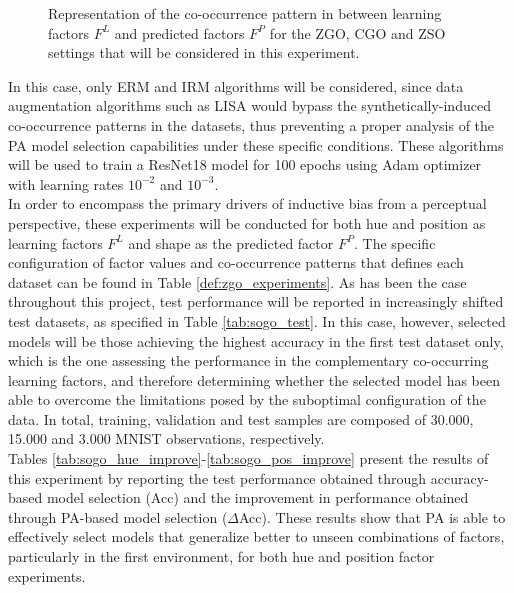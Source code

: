 \begin{figure}[H]
        \caption{Representation of the co-occurrence pattern in between learning factors $F^L$ and predicted
        factors $F^P$ for the ZGO, CGO and ZSO settings that will be considered in this experiment.
        }
    \end{figure}

In this case, only ERM and IRM \cite{arjovskyInvariantRiskMinimization2020}
algorithms will be considered, since data augmentation algorithms such as LISA \cite{yaoImprovingOutofDistributionRobustness2022}
would bypass the synthetically-induced co-occurrence patterns in the datasets, thus preventing a proper 
analysis of the PA model selection capabilities under these specific conditions. These algorithms will be used to 
train a ResNet18 model for 100 epochs using Adam optimizer with learning rates $10^{-2}$ and $10^{-3}$. \\

In order to encompass the primary drivers of inductive bias from a perceptual perspective, these experiments
will be conducted for both hue and position as learning factors $F^L$ and shape as 
the predicted factor $F^P$. The specific configuration of factor values 
and co-occurrence patterns that defines each dataset can be found in Table \ref{def:zgo_experiments}. As has been the case throughout this project, 
test performance will be reported in increasingly shifted test datasets, as specified in Table \ref{tab:sogo_test}. In this case, however,
selected models will be those achieving the highest accuracy in the first test dataset only, which is 
the one assessing the performance in the complementary co-occurring learning factors, and therefore
determining whether the selected model has been able to overcome the limitations posed by the suboptimal
configuration of the data. In total, training, validation and test samples are composed of 30.000, 
15.000 and 3.000 MNIST observations, respectively.\\

Tables \ref{tab:sogo_hue_improve}-\ref{tab:sogo_pos_improve} present the results of this experiment by reporting
the test performance obtained through accuracy-based model selection (Acc) and the improvement in performance obtained
through PA-based model selection ($\Delta$Acc). These results show that PA is able to effectively select models that generalize
better to unseen combinations of factors, particularly in the first environment, for both hue and position factor
experiments. \\

